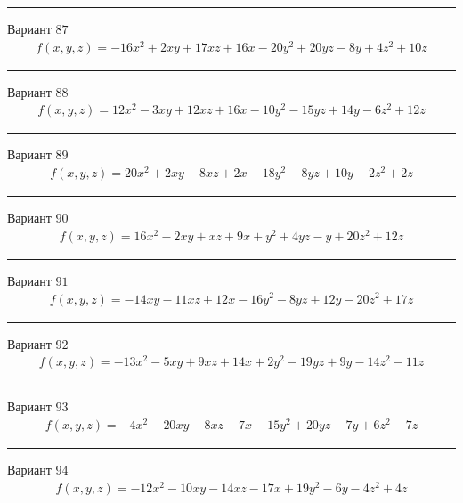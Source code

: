 \documentclass[11pt]{report}
\begin{document}
\begin{center}
\noindent\rule{8cm}{0.4pt}
\end{center}
Вариант $87$
\begin{align*}
    f(x, y, z) = - 16 x^{2} + 2 x y + 17 x z + 16 x - 20 y^{2} + 20 y z - 8 y + 4 z^{2} + 10 z
\end{align*}
\begin{center}
\noindent\rule{8cm}{0.4pt}
\end{center}
Вариант $88$
\begin{align*}
    f(x, y, z) = 12 x^{2} - 3 x y + 12 x z + 16 x - 10 y^{2} - 15 y z + 14 y - 6 z^{2} + 12 z
\end{align*}
\begin{center}
\noindent\rule{8cm}{0.4pt}
\end{center}
Вариант $89$
\begin{align*}
    f(x, y, z) = 20 x^{2} + 2 x y - 8 x z + 2 x - 18 y^{2} - 8 y z + 10 y - 2 z^{2} + 2 z
\end{align*}
\begin{center}
\noindent\rule{8cm}{0.4pt}
\end{center}
Вариант $90$
\begin{align*}
    f(x, y, z) = 16 x^{2} - 2 x y + x z + 9 x + y^{2} + 4 y z - y + 20 z^{2} + 12 z
\end{align*}
\begin{center}
\noindent\rule{8cm}{0.4pt}
\end{center}
Вариант $91$
\begin{align*}
    f(x, y, z) = - 14 x y - 11 x z + 12 x - 16 y^{2} - 8 y z + 12 y - 20 z^{2} + 17 z
\end{align*}
\begin{center}
\noindent\rule{8cm}{0.4pt}
\end{center}
Вариант $92$
\begin{align*}
    f(x, y, z) = - 13 x^{2} - 5 x y + 9 x z + 14 x + 2 y^{2} - 19 y z + 9 y - 14 z^{2} - 11 z
\end{align*}
\begin{center}
\noindent\rule{8cm}{0.4pt}
\end{center}
Вариант $93$
\begin{align*}
    f(x, y, z) = - 4 x^{2} - 20 x y - 8 x z - 7 x - 15 y^{2} + 20 y z - 7 y + 6 z^{2} - 7 z
\end{align*}
\begin{center}
\noindent\rule{8cm}{0.4pt}
\end{center}
Вариант $94$
\begin{align*}
    f(x, y, z) = - 12 x^{2} - 10 x y - 14 x z - 17 x + 19 y^{2} - 6 y - 4 z^{2} + 4 z
\end{align*}
\end{document}
